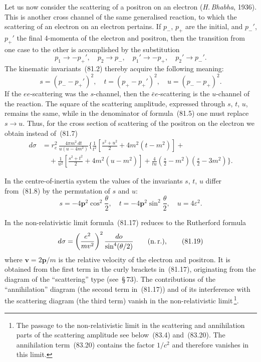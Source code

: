 Let us now consider the scattering of a positron on an electron (\textit{H.\,Bhabha}, 1936). This is another cross channel of the same generalised reaction, to which the scattering of an electron on an electron pertains. If $p_-$, $p_+$ are the initial, and $p_-'$, $p_+'$ the final 4-momenta of the electron and positron, then the transition from one case to the other is accomplished by the substitution
\[
p_1 \to -p_+',\quad p_2 \to p_-,\quad p_1' \to -p_+,\quad p_2' \to p_-'.
\]
The kinematic invariants~(81.2) thereby acquire the following meaning:
\begin{equation}
s = (p_- - p_+')^2,\quad t = (p_+ - p_+')^2,\quad u = (p_- - p_+)^2.
\tag{81.16}
\end{equation}
If the $ee$-scattering was the $s$-channel, then the $\bar{e}e$-scattering is the $u$-channel of the reaction. The square of the scattering amplitude, expressed through $s$, $t$, $u$, remains the same, while in the denominator of formula~(81.5) one must replace $s \to u$. Thus, for the cross section of scattering of the positron on the electron we obtain instead of~(81.7)
\begin{equation}
\begin{split}
d\sigma &= r_e^2\,\frac{4\pi m^2\,dt}{u(u-4m^2)}\bigg\{\frac{1}{t^2}\left[\frac{s^2+u^2}{2}+4m^2(t-m^2)\right]+{}\\
&\quad+\frac{1}{u^2}\left[\frac{s^2+t^2}{2}+4m^2(u-m^2)\right]+\frac{4}{tu}\left(\frac{s}{2}-m^2\right)\left(\frac{s}{2}-3m^2\right)\bigg\}.
\end{split}
\tag{81.17}
\end{equation}

In the centre-of-inertia system the values of the invariants $s$, $t$, $u$ differ from~(81.8) by the permutation of $s$ and $u$:
\begin{equation}
s = -4\mathbf{p}^2\cos^2\frac{\theta}{2},\quad t = -4\mathbf{p}^2\sin^2\frac{\theta}{2},\quad u = 4\varepsilon^2.
\tag{81.18}
\end{equation}

In the non-relativistic limit formula~(81.17) reduces to the Rutherford formula
\begin{equation}
d\sigma = \left(\frac{e^2}{mv^2}\right)^2\frac{do}{\sin^4(\theta/2)}\qquad\text{(n.\,r.)},
\tag{81.19}
\end{equation}
where $\mathbf{v} = 2\mathbf{p}/m$ is the relative velocity of the electron and positron. It is obtained from the first term in the curly brackets in~(81.17), originating from the diagram of the ``scattering'' type (see~\S\,73). The contributions of the ``annihilation'' diagram (the second term in~(81.17)) and of its interference with the scattering diagram (the third term) vanish in the non-relativistic limit\,\footnote{The passage to the non-relativistic limit in the scattering and annihilation parts of the scattering amplitude see below~(83.4) and~(83.20). The annihilation term~(83.20) contains the factor $1/c^2$ and therefore vanishes in this limit.}.

